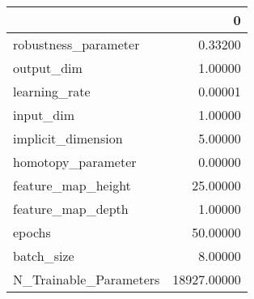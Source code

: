 \begin{tabular}{lr}
\toprule
{} &            0 \\
\midrule
robustness\_parameter   &      0.33200 \\
output\_dim             &      1.00000 \\
learning\_rate          &      0.00001 \\
input\_dim              &      1.00000 \\
implicit\_dimension     &      5.00000 \\
homotopy\_parameter     &      0.00000 \\
feature\_map\_height     &     25.00000 \\
feature\_map\_depth      &      1.00000 \\
epochs                 &     50.00000 \\
batch\_size             &      8.00000 \\
N\_Trainable\_Parameters &  18927.00000 \\
\bottomrule
\end{tabular}
